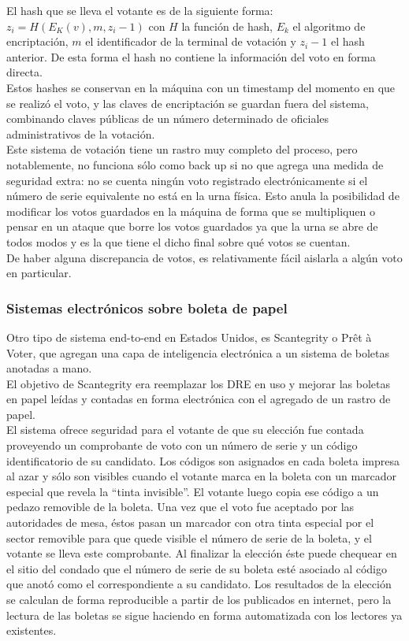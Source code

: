 El hash que se lleva el votante es de la siguiente forma: $z_i = H(E_K(v),m,z_i-1)$ con $H$ la función de hash, $E_k$ el algoritmo de encriptación, $m$ el identificador de la terminal de votación y $z_i - 1$ el hash anterior. De esta forma el hash no contiene la información del voto en forma directa. \\

Estos hashes se conservan en la máquina con un timestamp del momento en que se realizó el voto, y las claves de encriptación se guardan fuera del sistema, combinando claves públicas de un número determinado de oficiales administrativos de la votación. \\

Este sistema de votación tiene un rastro muy completo del proceso, pero notablemente, no funciona sólo como back up si no que agrega una medida de seguridad extra: no se cuenta ningún voto registrado electrónicamente si el número de serie equivalente no está en la urna física. Esto anula la posibilidad de modificar los votos guardados en la máquina de forma que se multipliquen o pensar en un ataque que borre los votos guardados ya que la urna se abre de todos modos y es la que tiene el dicho final sobre qué votos se cuentan.\\

De haber alguna discrepancia de votos, es relativamente fácil aislarla a algún voto en particular. \\

\subsubsection{Sistemas electrónicos sobre boleta de papel}
Otro tipo de sistema end-to-end en Estados Unidos, es Scantegrity\cite{scantegrity} o Prêt à Voter, que agregan una capa de inteligencia electrónica a un sistema de boletas anotadas a mano. \\
El objetivo de Scantegrity era reemplazar los DRE en uso y mejorar las boletas en papel leídas y contadas en forma electrónica con el agregado de un rastro de papel. \\
El sistema ofrece seguridad para el votante de que su elección fue contada proveyendo un comprobante de voto con un número de serie y un código identificatorio de su candidato. Los códigos son asignados en cada boleta impresa al azar y sólo son visibles cuando el votante marca en la boleta con un marcador especial que revela la “tinta invisible”. El votante luego copia ese código a un pedazo removible de la boleta. Una vez que el voto fue aceptado por las autoridades de mesa, éstos pasan un marcador con otra tinta especial por el sector removible para que quede visible el número de serie de la boleta, y el votante se lleva este comprobante. Al finalizar la elección éste puede chequear en el sitio del condado que el número de serie de su boleta esté asociado al código que anotó como el correspondiente a su candidato. Los resultados de la elección se calculan de forma reproducible a partir de los publicados en internet, pero la lectura de las boletas se sigue haciendo en forma automatizada con los lectores ya existentes.\\


